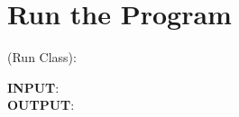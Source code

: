 \section{Run the Program}
\item (Run Class): 
\begin{algorithm}
\caption{}
\bigskip
\textbf{INPUT}:\\
\textbf{OUTPUT}:
\begin{algorithmic}[1]
  \item\\
  \Return 
\end{algorithmic}
\end{algorithm}
